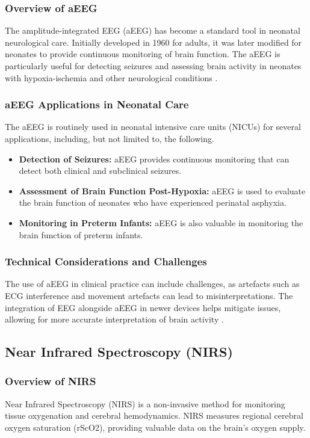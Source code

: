 \documentclass[12pt,journal,compsoc]{IEEEtran}
\begin{document}
\subsubsection{Overview of aEEG}
The amplitude-integrated EEG (aEEG) has become a standard tool in neonatal neurological care. Initially developed in 1960 for adults, it was later modified for neonates to provide continuous monitoring of brain function. The aEEG is particularly useful for detecting seizures and assessing brain activity in neonates with hypoxia-ischemia and other neurological conditions \cite{IEEEhowto:toet}.

\subsubsection{aEEG Applications in Neonatal Care}
The aEEG is routinely used in neonatal intensive care units (NICUs) for several applications, including, but not limited to, the following. 

\begin{itemize}
    \item \textbf{Detection of Seizures:} aEEG provides continuous monitoring that can detect both clinical and subclinical seizures.
    \item \textbf{Assessment of Brain Function Post-Hypoxia:} aEEG is used to evaluate the brain function of neonates who have experienced perinatal asphyxia.
    \item \textbf{Monitoring in Preterm Infants:} aEEG is also valuable in monitoring the brain function of preterm infants.
\end{itemize}

\subsubsection{Technical Considerations and Challenges}
The use of aEEG in clinical practice can include challenges, as artefacts such as ECG interference and movement artefacts can lead to misinterpretations. The integration of EEG alongside aEEG in newer devices helps mitigate issues, allowing for more accurate interpretation of brain activity \cite{IEEEhowto:toet}.

\subsection{Near Infrared Spectroscopy (NIRS)}

\subsubsection{Overview of NIRS}
Near Infrared Spectroscopy (NIRS) is a non-invasive method for monitoring tissue oxygenation and cerebral hemodynamics. NIRS measures regional cerebral oxygen saturation (rScO2), providing valuable data on the brain's oxygen supply. 
\end{document}
